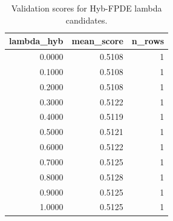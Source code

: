 \begin{table}[t]
\caption{Validation scores for Hyb-FPDE lambda candidates.}
\label{tab:lambda_distribution_computed}
\centering
\begin{tabular}{rrr}
\toprule
lambda\_hyb & mean\_score & n\_rows \\
\midrule
0.0000 & 0.5108 & 1 \\
0.1000 & 0.5108 & 1 \\
0.2000 & 0.5108 & 1 \\
0.3000 & 0.5122 & 1 \\
0.4000 & 0.5119 & 1 \\
0.5000 & 0.5121 & 1 \\
0.6000 & 0.5122 & 1 \\
0.7000 & 0.5125 & 1 \\
0.8000 & 0.5128 & 1 \\
0.9000 & 0.5125 & 1 \\
1.0000 & 0.5125 & 1 \\
\bottomrule
\end{tabular}

\end{table}
